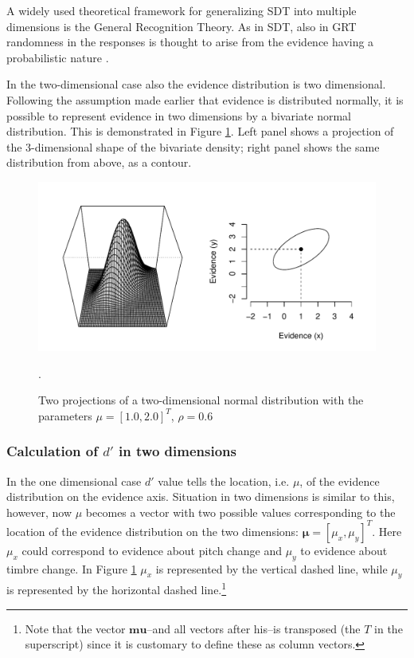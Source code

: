 \documentclass{article}\usepackage{knitr}
\begin{document}
A widely used theoretical framework for generalizing SDT into multiple dimensions is the General Recognition Theory. As in SDT, also in GRT randomness in the responses is thought to arise from the evidence having a probabilistic nature \citep{ashby1986, ashby2015, kadlec1992}. 

In the two-dimensional case also the evidence distribution is two dimensional. Following the assumption made earlier that evidence is distributed normally, it is possible to represent evidence in two dimensions by a bivariate normal distribution. This is demonstrated in Figure \ref{fig:2dimnorm}. Left panel shows a projection of the 3-dimensional shape of the bivariate density; right panel shows the same distribution from above, as a contour.  

\begin{figure}
\centering
\begin{knitrout}
\color{fgcolor}
\includegraphics[width=\maxwidth]{figure/unnamed-chunk-7-1} 

\end{knitrout}
\caption{Two projections of a two-dimensional normal distribution with the parameters $\mu = [1.0, 2.0]^T$, $\rho = 0.6$}. 
\label{fig:2dimnorm}
\end{figure}

\subsubsection{Calculation of $d'$ in two dimensions}

In the one dimensional case $d'$ value tells the location, i.e. $\mu$, of the evidence distribution on the evidence axis. Situation in two dimensions is similar to this, however, now $\mu$ becomes a vector with two possible values corresponding to the location of the evidence distribution on the two dimensions: $\bm{\mu} = [\mu_x, \mu_y]^T$. Here $\mu_x$ could correspond to evidence about pitch change and $\mu_y$ to evidence about timbre change. In Figure \ref{fig:2dimnorm} $\mu_x$ is represented by the vertical dashed line, while $\mu_y$ is represented by the horizontal dashed line.\footnote{Note that the vector $\bm{mu}$--and all vectors after his--is transposed (the $T$ in the superscript) since it is customary to define these as column vectors.}
\end{document}

